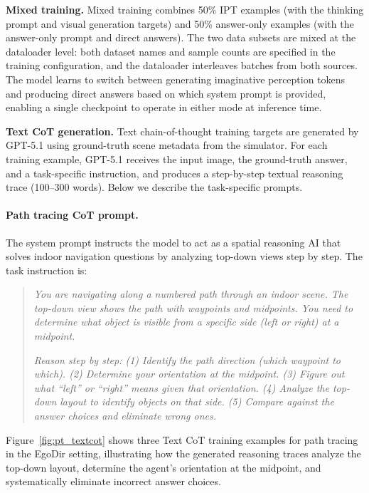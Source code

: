 \noindent\textbf{Mixed training.}
Mixed training combines 50\% IPT examples (with the thinking prompt and visual generation targets) and 50\% answer-only examples (with the answer-only prompt and direct answers).
The two data subsets are mixed at the dataloader level: both dataset names and sample counts are specified in the training configuration, and the dataloader interleaves batches from both sources.
The model learns to switch between generating imaginative perception tokens and producing direct answers based on which system prompt is provided, enabling a single checkpoint to operate in either mode at inference time.

\noindent\textbf{Text CoT generation.}
Text chain-of-thought training targets are generated by GPT-5.1 using ground-truth scene metadata from the simulator.
For each training example, GPT-5.1 receives the input image, the ground-truth answer, and a task-specific instruction, and produces a step-by-step textual reasoning trace (100--300 words).
Below we describe the task-specific prompts.

\paragraph{Path tracing CoT prompt.}
The system prompt instructs the model to act as a spatial reasoning AI that solves indoor navigation questions by analyzing top-down views step by step.
The task instruction is:

\begin{quote}\small
\textit{You are navigating along a numbered path through an indoor scene. The top-down view shows the path with waypoints and midpoints. You need to determine what object is visible from a specific side (left or right) at a midpoint.}

\textit{Reason step by step:
(1) Identify the path direction (which waypoint to which).
(2) Determine your orientation at the midpoint.
(3) Figure out what ``left'' or ``right'' means given that orientation.
(4) Analyze the top-down layout to identify objects on that side.
(5) Compare against the answer choices and eliminate wrong ones.}
\end{quote}

\noindent Figure~\ref{fig:pt_textcot} shows three Text CoT training examples for path tracing in the EgoDir setting, illustrating how the generated reasoning traces analyze the top-down layout, determine the agent's orientation at the midpoint, and systematically eliminate incorrect answer choices.

